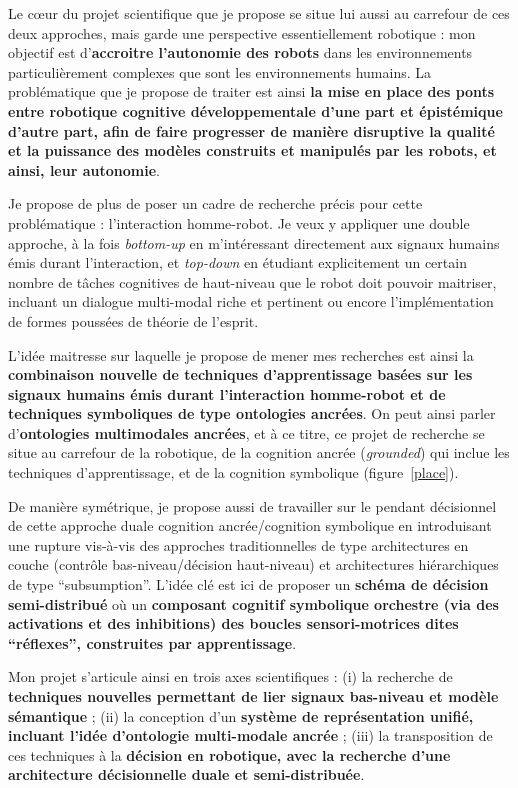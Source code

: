 \documentclass[a4paper]{article}
\begin{document}
Le c\oe ur du projet scientifique que je propose se situe lui aussi au carrefour
de ces deux approches, mais garde une perspective essentiellement robotique :
mon objectif est d'\textbf{accroitre l'autonomie des robots} dans les
environnements particulièrement complexes que sont les environnements humains.
La problématique que je propose de traiter est ainsi \textbf{la mise en
place des ponts entre robotique cognitive développementale d'une part et
épistémique d'autre part, afin de faire progresser de manière disruptive la
qualité et la puissance des modèles construits et manipulés par les robots, et
ainsi, leur autonomie}.

Je propose de plus de poser un cadre de recherche précis pour cette
problématique : l'interaction homme-robot. Je veux y appliquer une double
approche, à la fois \emph{bottom-up} en m'intéressant directement aux
signaux humains émis durant l'interaction, et \emph{top-down} en étudiant
explicitement un certain nombre de tâches cognitives de haut-niveau que le robot
doit pouvoir maitriser, incluant un dialogue multi-modal riche et pertinent ou
encore l'implémentation de formes poussées de théorie de l'esprit.

L'idée maitresse sur laquelle je propose de mener mes recherches est ainsi la
\textbf{combinaison nouvelle de techniques d'apprentissage basées sur les
signaux humains émis durant l'interaction homme-robot et de techniques
symboliques de type ontologies ancrées}. On peut ainsi parler
d'\textbf{ontologies multimodales ancrées}, et à ce titre, ce projet de
recherche se situe au carrefour de la robotique, de la cognition ancrée
(\emph{grounded}) qui inclue les techniques d'apprentissage, et de la cognition
symbolique (figure~\ref{place}).

De manière symétrique, je propose aussi de travailler sur le pendant décisionnel
de cette approche duale cognition ancrée/cognition symbolique en introduisant
une rupture vis-à-vis des approches traditionnelles de type architectures en
couche (contrôle bas-niveau/décision haut-niveau) et architectures
hiérarchiques de type ``subsumption''. L'idée clé est ici de proposer un
\textbf{schéma de décision semi-distribué} où un \textbf{composant cognitif
symbolique orchestre (via des activations et des inhibitions) des boucles
sensori-motrices dites ``réflexes'', construites par apprentissage}.

Mon projet s'articule ainsi en trois axes scientifiques : (i) la recherche de
\textbf{techniques nouvelles permettant de lier signaux bas-niveau et modèle
sémantique} ; (ii) la conception d'un \textbf{système de représentation unifié,
incluant l'idée d'ontologie multi-modale ancrée} ; (iii) la transposition de ces
techniques à la \textbf{décision en robotique, avec la recherche d'une
architecture décisionnelle duale et semi-distribuée}.
\end{document}
